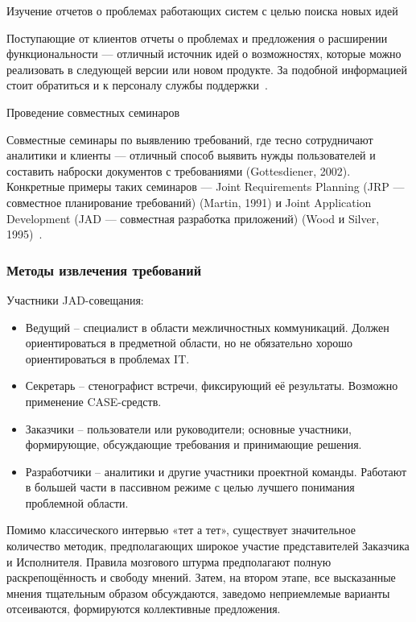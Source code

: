 \documentclass{../industrial-development}
\begin{document}
\alert{Изучение отчетов о проблемах работающих систем с целью поиска новых идей}

Поступающие от клиентов отчеты о проблемах и
предложения о расширении функциональности — отличный источник идей о возможностях, которые можно реализовать в следующей версии или новом продукте. За подобной информацией стоит обратиться
и к персоналу службы поддержки~\cite[с.~48]{Wiegers}.

\alert{Проведение совместных семинаров}

Совместные семинары по выявлению требований, где тесно сотрудничают аналитики и клиенты —
отличный способ выявить нужды пользователей и составить наброски документов с требованиями (Gottesdiener, 2002). Конкретные примеры таких семинаров — Joint Requirements Planning (JRP — совместное планирование требований) (Martin, 1991) и Joint Application Development (JAD — совместная разработка приложений) (Wood и Silver, 1995)~\cite[с.~47]{Wiegers}.

\begin{frame} \frametitle{Методы извлечения требований}
Участники JAD-совещания:
  \begin{itemize} 
\item \alert{Ведущий} – специалист в области межличностных коммуникаций. Должен
ориентироваться в предметной области, но не обязательно хорошо ориентироваться в
проблемах IT.
\item \alert{Секретарь} – стенографист встречи, фиксирующий её результаты. Возможно применение CASE-средств.
\item \alert{Заказчики} – пользователи или руководители; основные участники, формирующие,
обсуждающие требования и принимающие решения.
\item \alert{Разработчики} – аналитики и другие участники проектной команды. Работают в
большей части в пассивном режиме с целью лучшего понимания проблемной области.
\end{itemize}
\end{frame}

\lecturenotes

Помимо классического интервью «тет а тет», существует значительное количество
методик, предполагающих широкое участие представителей Заказчика и Исполнителя.
Правила мозгового штурма предполагают полную раскрепощённость и свободу мнений. 
Затем, на втором этапе, все высказанные мнения тщательным образом обсуждаются, заведомо неприемлемые варианты отсеиваются, формируются
коллективные предложения.
\end{document}
